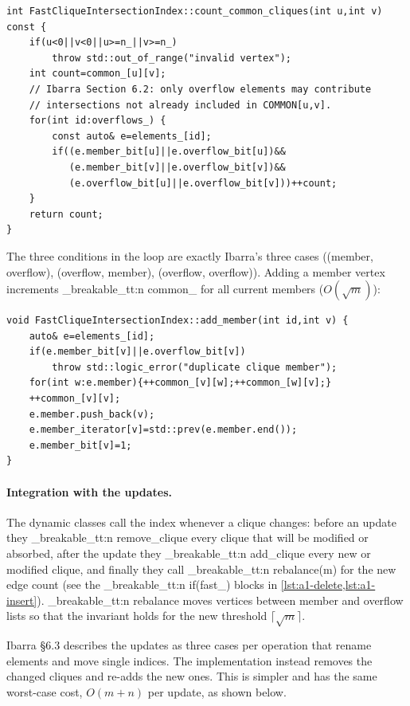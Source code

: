 \documentclass[11pt,a4paper,oneside]{report}
\theoremstyle{plain}
\theoremstyle{definition}
\theoremstyle{remark}
\newcommand{\op}[1]{\textsf{#1}}
\DeclareRobustCommand{\code}[1]{\mtp_breakable_tt:n {#1}}
\DeclareRobustCommand{\file}[1]{\mtp_breakable_tt:n {#1}}
\begin{document}
\begin{lstlisting}[style=cpp,firstnumber=100,caption={\file{src/fast_delete_ibarra.cpp}, lines 100--113: the intersection count used by \op{Delete-Query}.},label={lst:yellin-query}]
int FastCliqueIntersectionIndex::count_common_cliques(int u,int v) const {
    if(u<0||v<0||u>=n_||v>=n_)
        throw std::out_of_range("invalid vertex");
    int count=common_[u][v];
    // Ibarra Section 6.2: only overflow elements may contribute
    // intersections not already included in COMMON[u,v].
    for(int id:overflows_) {
        const auto& e=elements_[id];
        if((e.member_bit[u]||e.overflow_bit[u])&&
           (e.member_bit[v]||e.overflow_bit[v])&&
           (e.overflow_bit[u]||e.overflow_bit[v]))++count;
    }
    return count;
}
\end{lstlisting}

\noindent The three conditions in the loop are exactly Ibarra's three cases ((member, overflow),
(overflow, member), (overflow, overflow)). Adding a member vertex increments \code{common_} for
all current members (\(O(\sqrt m)\)):

\begin{lstlisting}[style=cpp,firstnumber=16,caption={\file{src/fast_delete_ibarra.cpp}, lines 16--25: adding a member vertex to an element.},label={lst:yellin-add}]
void FastCliqueIntersectionIndex::add_member(int id,int v) {
    auto& e=elements_[id];
    if(e.member_bit[v]||e.overflow_bit[v])
        throw std::logic_error("duplicate clique member");
    for(int w:e.member){++common_[v][w];++common_[w][v];}
    ++common_[v][v];
    e.member.push_back(v);
    e.member_iterator[v]=std::prev(e.member.end());
    e.member_bit[v]=1;
}
\end{lstlisting}

\paragraph{Integration with the updates.} The dynamic classes call the index whenever a clique
changes: before an update they \code{remove_clique} every clique that will be modified or
absorbed, after the update they \code{add_clique} every new or modified clique, and finally they
call \code{rebalance(m)} for the new edge count (see the \code{if(fast_)} blocks in
\cref{lst:a1-delete,lst:a1-insert}). \code{rebalance} moves vertices between member and overflow
lists so that the invariant holds for the new threshold \(\lceil\sqrt m\rceil\).

\begin{caution}
Ibarra \S6.3 describes the updates as three cases per operation that rename elements and move
single indices. The implementation instead removes the changed cliques and re-adds the new
ones. This is simpler and has the same worst-case cost, \(O(m+n)\) per update, as shown below.
\end{caution}
\end{document}
